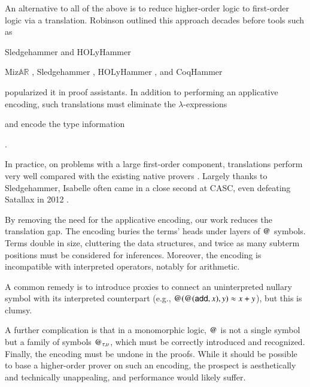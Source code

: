   
  An alternative to all of the above is to reduce higher-order logic to first-order
  logic via a translation. Robinson \cite{ar-70-hol}
  outlined this approach decades before tools such as
  \begin{conf}Sledgehammer \cite{pb-12-sh} and
  HOLyHammer \cite{ku-15-holyhammer}\end{conf}%
  \begin{rep}Miz$\mathbb{AR}$ \cite{urs-13-atp},
  Sledgehammer \cite{pb-12-sh},
  HOLyHammer \cite{ku-15-holyhammer}, and
  CoqHammer \cite{ck-18-coqhammer}\end{rep}
  popularized it in proof assistants.
  In addition to performing an applicative encoding, such translations must
  eliminate the \hbox{$\lambda$-expressions}\begin{rep}
  \cite{mp-08-trans,lc-16-lam-trans}\end{rep} and encode the type
  information\begin{rep} \cite{bkpu-16-hammering-types}\end{rep}.
  \begin{rep}%
  In practice, on problems with a large first-order component, translations
  perform very well compared with the existing native provers
  \cite{ns-13-leo2sh}. Largely thanks to Sledgehammer, Isabelle often came
  in a close second at CASC, even defeating Satallax in 2012
  \cite{gs-13-cascj6}.
  \end{rep}
  
  By removing the need for the applicative encoding, our work reduces
  the translation gap. The encoding buries the \lfhol{} terms' heads under
  layers of $\mathsf{@}$ symbols. %
  Terms double in size, cluttering the data structures, and twice as many
  subterm positions must be considered for inferences. Moreover, the encoding is
  incompatible with interpreted operators, notably for arithmetic.
  \begin{rep}A common remedy is to introduce proxies to connect an
  uninterpreted nullary symbol with its interpreted counterpart
  (e.g., %
  $\mathsf{@}(\mathsf{@}(\mathsf{add}, x), y) \approx x + y$), but this is clumsy. \end{rep}A further
  complication is that in a monomorphic logic, $\mathsf{@}$ is not a single symbol
  but a family of symbols $\mathsf{@}_{\tau,\upsilon}$, which must be
  correctly introduced and recognized. Finally, the encoding must be undone in
  the proofs. While it should be possible to base a higher-order
  prover on such an encoding, the prospect is aesthetically and
  technically unappealing, and performance would likely suffer.
  

